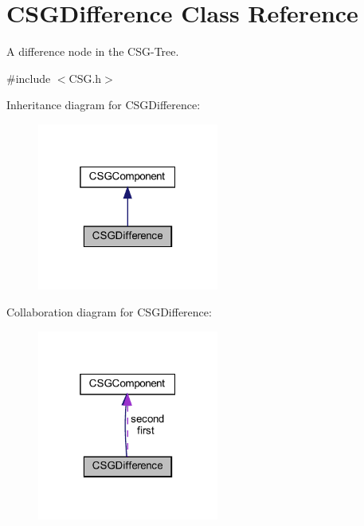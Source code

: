 \hypertarget{classCSGDifference}{}\section{C\+S\+G\+Difference Class Reference}
\label{classCSGDifference}


A difference node in the C\+S\+G-\/\+Tree.  




{\ttfamily \#include $<$C\+S\+G.\+h$>$}



Inheritance diagram for C\+S\+G\+Difference\+:
\nopagebreak
\begin{figure}[H]
\begin{center}
\leavevmode
\includegraphics[width=169pt]{classCSGDifference__inherit__graph}
\end{center}
\end{figure}


Collaboration diagram for C\+S\+G\+Difference\+:
\nopagebreak
\begin{figure}[H]
\begin{center}
\leavevmode
\includegraphics[width=169pt]{classCSGDifference__coll__graph}
\end{center}
\end{figure}

